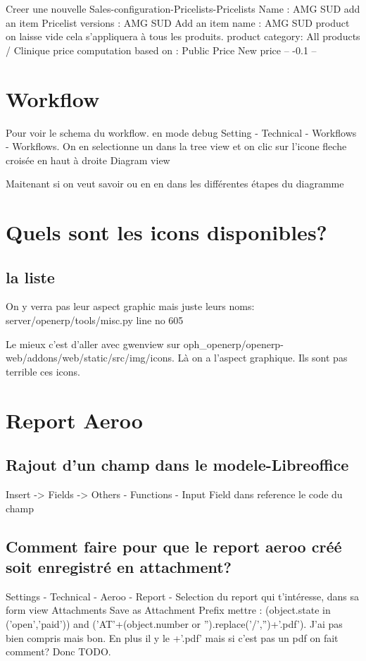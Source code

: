 \documentclass[12pt,a4paper]{article}
\begin{document}
Creer une nouvelle Sales-configuration-Pricelists-Pricelists 
Name : AMG SUD
add an item
Pricelist versions : AMG SUD 
Add an item 
name : AMG SUD
product on laisse vide cela s'appliquera à tous les produits.
product category: All products / Clinique
price computation
based on : Public Price
New price -- -0.1 --
\section{Workflow}
\label{sec:workflow}


Pour voir le schema du workflow.
en mode debug
Setting - Technical - Workflows - Workflows.
On en selectionne un dans la tree view et on clic sur l'icone fleche croisée en haut à droite
Diagram view

Maitenant si on veut savoir ou en en dans les différentes étapes du diagramme

\section{Quels sont les icons disponibles?}
\label{sec:icons}

\subsection{la liste}
\label{sec:list}

On y verra pas leur aspect graphic mais juste leurs noms:
server/openerp/tools/misc.py line no 605

Le mieux c'est d'aller avec gwenview sur oph\_openerp/openerp-web/addons/web/static/src/img/icons. Là on a l'aspect graphique. Ils sont pas terrible ces icons.

\section{Report Aeroo}
\label{sec:aeroo_report}

\subsection{Rajout d'un champ dans le modele-Libreoffice}
Insert -> Fields -> Others - Functions - Input Field 
dans reference le code du champ
 
\subsection{Comment faire pour que le report aeroo créé soit enregistré en attachment?}
\label{sec:report2attachment}
Settings - Technical - Aeroo - Report - Selection du report qui t'intéresse, dans sa form view Attachments Save as Attachment Prefix mettre : (object.state in ('open','paid')) and ('AT'+(object.number or '').replace('/','')+'.pdf'). J'ai pas bien compris mais bon. En plus il y le +'.pdf' mais si c'est pas un pdf on fait comment? Donc TODO.
\end{document}
